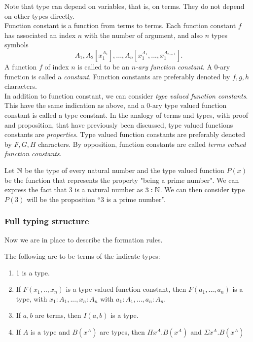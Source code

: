 Note that type can depend on variables, that is, on terms. They do not depend on other types directly.\\ 

Function constant is a function from terms to terms. Each function constant $f$ has associated an index $n$ with the number of argument, and also $n$ types symbols $$A_1, A_2[x_1^{A_1}],...,A_n[x_1^{A_1},...,x_1^{A_{n-1}}].$$ A function $f$ of index $n$ is called to be an \emph{$n$-ary function constant}. A 0-ary function is called a \emph{constant}.  Function constants are preferably denoted by $f,g,h$ characters. \\

In addition to function constant, we can consider \emph{type valued function constants}. This have the same indication as above, and a 0-ary type valued function constant is called a type constant. In the analogy of terms and types, with proof and proposition, that have previously been discussed, type valued functions constants are \emph{properties}. Type valued function constants are preferably denoted by $F,G,H$ characters. By opposition, function constants are called \emph{terms valued function constants}.


\begin{example}\label{example:primeML}
  Let $\mathbb{N}$ be the type of every natural number and the type valued function $P(x)$ be the function that represents the property "being a prime number". We can express the fact that 3 is a natural number as $3: \mathbb{N}$. We can then consider  type $P(3)$ will be the proposition ``3 is a prime number''. 
\end{example}

\subsubsection{Full typing structure}
Now we are in place to describe the formation rules.

\begin{definition}
  The following are to be terms of the indicate types:
  \begin{enumerate}
  \item 1 is a type.
  \item If $F(x_1,..,x_n)$ is a type-valued function constant, then $F(a_1,...,a_n)$ is a type, with  $x_1:A_1,...,x_n:A_n$ with $a_1:A_1,...,a_n:A_n$.
  \item If $a,b$ are terms, then $I(a,b)$ is a type.
  \item If $A$ is a type and $B(x^A)$ are types, then $\Pi x^A. B(x^A)$ and  $\Sigma x^A. B(x^A)$
  \end{enumerate}
\end{definition}

